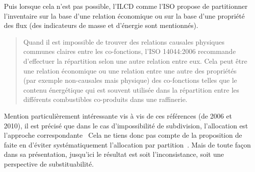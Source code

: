 Puis lorsque cela n'est pas possible, l'ILCD comme l'ISO propose de partitionner l'inventaire sur la base d'une relation économique ou sur la base d'une propriété des flux (des indicateurs de masse et d'énergie sont mentionnés).
\blockcquote[traduction p.~79]{european_commission_ilcd_2010}{
Quand il est impossible de trouver des relations causales physiques communes claires entre les co-fonctions, l'ISO 14044:2006 recommande d'effectuer la répartition selon une autre relation entre eux.
Cela peut être une relation économique ou une relation entre une autre des propriétés (par exemple non-causales mais physique) des co-fonctions telles que le contenu énergétique qui est souvent utilisée dans la répartition entre les différents combustibles co-produits dans une raffinerie.
}

Mention particulièrement intéressante vis à vis de ces références (de 2006 et 2010), il est précisé que dans le cas d'impossibilité de subdivision, l'allocation est l'approche correspondante~\cite[p.~80]{european_commission_ilcd_2010}
Cela ne tiens donc pas compte de la proposition de \citeauthor{weidema_avoiding_2000} faite en \citeyear{weidema_avoiding_2000} d'éviter systématiquement l'allocation par partition~\cite{weidema_avoiding_2000}.
Mais de toute façon dans sa présentation, jusqu'ici le résultat est soit l’inconsistance, soit une perspective de substituabilité.


